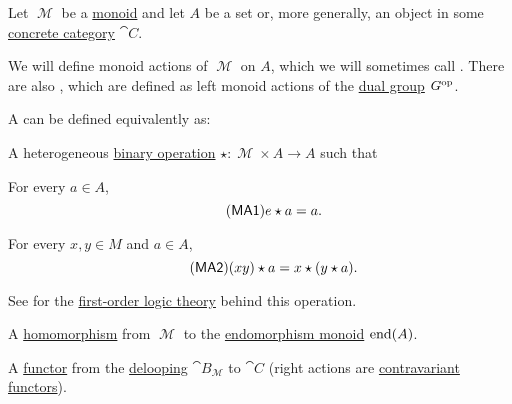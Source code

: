 \begin{definition}\label{def:monoid_action}
  Let \( \mscrM \) be a \hyperref[def:unital_magma/monoid]{monoid} and let \( A \) be a set or, more generally, an object in some \hyperref[def:concrete_category]{concrete category} \( \cat{C} \).

  We will define monoid actions of \( \mscrM \) on \( A \), which we will sometimes call . There are also , which are defined as left monoid actions of the \hyperref[def:group/duality]{dual group} \( G^{\operatorname{op}} \).

  A  can be defined equivalently as:
  \begin{thmenum}
     A heterogeneous \hyperref[def:magma]{binary operation} \( \star: \mscrM \times A \to A \) such that
    \begin{thmenum}
       For every \( a \in A \),
      \begin{equation}\label{eq:def:monoid_action/operation/identity}\tag{\logic{MA1}}
        e \star a = a.
      \end{equation}

       For every \( x, y \in M \) and \( a \in A \),
      \begin{equation}\label{eq:def:monoid_action/operation/compatibility}\tag{\logic{MA2}}
        (xy) \star a = x \star (y \star a).
      \end{equation}
    \end{thmenum}

    See  for the \hyperref[def:first_order_theory]{first-order logic theory} behind this operation.

     A \hyperref[def:unital_magma/homomorphism]{homomorphism} from \( \mscrM \) to the \hyperref[def:endomorphism_monoid]{endomorphism monoid} \( \operatorname{end}(A) \).

     A \hyperref[def:functor]{functor} from the \hyperref[def:monoid_delooping]{delooping} \( \cat{B}_\mscrM \) to \( \cat{C} \) (right actions are \hyperref[rem:contravariant_functor]{contravariant functors}).
  \end{thmenum}
\end{definition}
